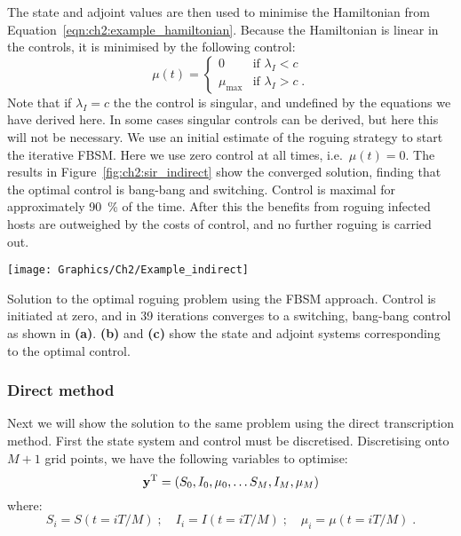 \begin{example}
    The state and adjoint values are then used to minimise the Hamiltonian from Equation~\ref{eqn:ch2:example_hamiltonian}. Because the Hamiltonian is linear in the controls, it is minimised by the following control:
    \begin{equation}
        \mu(t) = \begin{cases}
            0 & \text{if }\lambda_I < c \\
            \mu_\text{max} & \text{if }\lambda_I > c\;.
        \end{cases}
    \end{equation}
    Note that if $\lambda_I=c$ the the control is singular, and undefined by the equations we have derived here. In some cases singular controls can be derived, but here this will not be necessary. We use an initial estimate of the roguing strategy to start the iterative FBSM\@. Here we use zero control at all times, i.e.\ $\mu(t)=0$. The results in Figure~\ref{fig:ch2:sir_indirect} show the converged solution, finding that the optimal control is bang-bang and switching. Control is maximal for approximately \SI{90}{\percent} of the time. After this the benefits from roguing infected hosts are outweighed by the costs of control, and no further roguing is carried out.

    {
    \centering
    \captionsetup{type=figure}
        \texttt{[image: Graphics/Ch2/Example\_indirect]}
    \caption[Optimal roguing strategy using the indirect approach]{Solution to the optimal roguing problem using the FBSM approach. Control is initiated at zero, and in 39 iterations converges to a switching, bang-bang control as shown in \textbf{(a)}. \textbf{(b)} and \textbf{(c)} show the state and adjoint systems corresponding to the optimal control.\label{fig:ch2:sir_indirect}}
    }

    \subsubsection{Direct method}
    Next we will show the solution to the same problem using the direct transcription method. First the state system and control must be discretised. Discretising onto $M+1$ grid points, we have the following variables to optimise:
    \begin{equation}
        \mathbf{\bm{y}}^\mathrm{T} = \left(S_0, I_0, \mu_0, \ldots S_M, I_M, \mu_M\right)
    \end{equation}
    where:
    \begin{equation}
            S_i = S(t=iT/M)\;; \quad I_i = I(t=iT/M)\;; \quad \mu_i = \mu(t=iT/M)\;.
    \end{equation}


\end{example}

